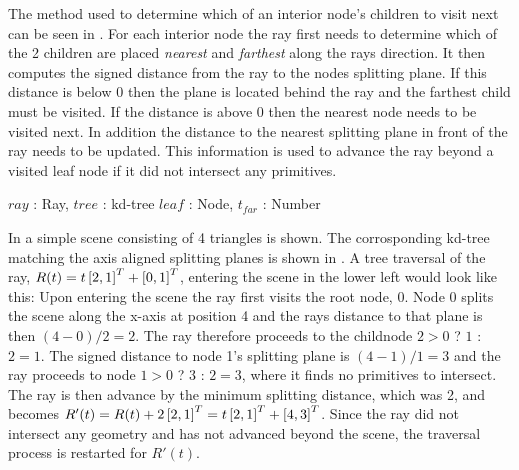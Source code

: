 
The method used to determine which of an interior node's children to
visit next can be seen in . For each
interior node the ray first needs to determine which of the 2 children
are placed \textit{nearest} and \textit{farthest} along the rays
direction. It then computes the signed distance from the ray to the
nodes splitting plane. If this distance is below 0 then the plane is
located behind the ray and the farthest child must be visited. If the
distance is above 0 then the nearest node needs to be visited next. In
addition the distance to the nearest splitting plane in front of the
ray needs to be updated. This information is used to advance the ray
beyond a visited leaf node if it did not intersect any primitives.

\begin{algorithm}
  \caption{A basic kd-tree traversal algorithm}
  \label{alg:generelTraversal}
  \begin{algorithmic}
              {$ray$ : Ray, $tree$ : kd-tree}
              {$leaf$ : Node, $t_{far}$ : Number}{
                  \ELSE
                  \ENDIF
                \ENDWHILE
              }
  \end{algorithmic}
\end{algorithm}

In  a simple scene consisting of 4 triangles
is shown. The corrosponding kd-tree matching the axis aligned
splitting planes is shown in . A tree traversal
of the ray, $R(t) = t \left[2, 1 \right]^T + \left[0, 1 \right]^T$, entering the
scene in the lower left would look like this: Upon entering the scene
the ray first visits the root node, 0. Node 0 splits the scene along
the x-axis at position 4 and the rays distance to that plane is then
$(4 - 0) / 2 = 2$. The ray therefore proceeds to the childnode $2 > 0$ 
? $1$ : $2 = 1$. The signed distance to node 1's splitting plane is $(4 -
1) / 1 = 3$ and the ray proceeds to node $1 > 0$ ? $3$ : $2 = 3$, where it
finds no primitives to intersect. The ray is then advance by the
minimum splitting distance, which was 2, and becomes $R'(t) = R(t) + 2
\left[2, 1 \right]^T = t \left[2, 1 \right]^T + \left[4, 3 \right]^T$. Since the ray did
not intersect any geometry and has not advanced beyond the scene, the
traversal process is restarted for $R'(t)$.


